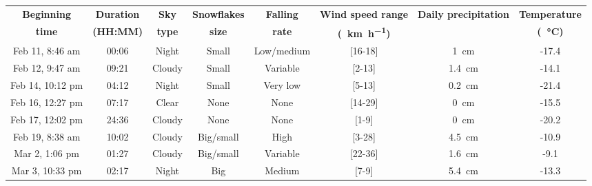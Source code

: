 \begin{table}[htbp]
    \centering
    \\
    \\
    \begin{tabular}{|c|c|c|c|c|c|c|c|}
        \hline
        \textbf{Beginning} & \textbf{Duration} & \textbf{Sky}  & \textbf{Snowflakes} & \textbf{Falling} & \textbf{Wind speed range}      & \textbf{Daily precipitation} & \textbf{Temperature}     \\
        \textbf{time}      & \textbf{(HH:MM)}  & \textbf{type} & \textbf{size}       & \textbf{rate}    & \textbf{(\SI{}{\km\per\hour})} &                              & \textbf{(\SI{}{\celsius})}      \\\hline
        Feb 11, 8:46 am    &  00:06            & Night         & Small               & Low/medium       & [16-18]                        & \SI{1}{\cm}                  & -17.4 \\\hline
        Feb 12, 9:47 am    &  09:21            & Cloudy        & Small               & Variable         & [2-13]                         & \SI{1.4}{\cm}                & -14.1 \\\hline
        Feb 14, 10:12 pm   &  04:12            & Night         & Small               & Very low         & [5-13]                         & \SI{0.2}{\cm}                & -21.4 \\\hline
        Feb 16, 12:27 pm   &  07:17            & Clear         & None                & None             & [14-29]                        & \SI{0}{\cm}                  & -15.5 \\\hline
        Feb 17, 12:02 pm   &  24:36            & Cloudy        & None                & None             & [1-9]                          & \SI{0}{\cm}                  & -20.2 \\\hline
        Feb 19, 8:38 am    &  10:02            & Cloudy        & Big/small           & High             & [3-28]                         & \SI{4.5}{\cm}                & -10.9 \\\hline
        Mar 2, 1:06 pm     &  01:27            & Cloudy        & Big/small           & Variable         & [22-36]                        & \SI{1.6}{\cm}                & -9.1  \\\hline
        Mar 3, 10:33 pm    &  02:17            & Night         & Big                 & Medium           & [7-9]                          & \SI{5.4}{\cm}                & -13.3 \\\hline

\end{tabular}
\end{table}
